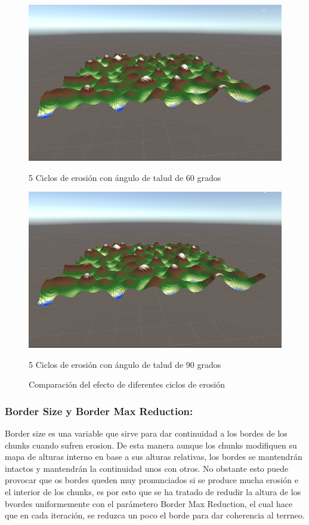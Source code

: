 \begin{figure}[ht]
    \vspace{0.5cm} %
    
    \begin{minipage}{0.45\textwidth}
        \centering
        \includegraphics[width=\textwidth]{img/talud60.png}
        \caption{5 Ciclos de erosión con ángulo de talud de 60 grados}
    \end{minipage}%
    \hfill
    \begin{minipage}{0.45\textwidth}
        \centering
        \includegraphics[width=\textwidth]{img/talud90.png}
        \caption{5 Ciclos de erosión con ángulo de talud de 90 grados}
    \end{minipage}
    \caption{Comparación del efecto de diferentes ciclos de erosión}
\end{figure}

\subsubsection{Border Size y Border Max Reduction: }Border size es una variable que sirve para dar continuidad a los bordes de los chunks cuando sufren erosion. De esta manera aunque los chunks modifiquen su mapa de alturas interno en base a sus alturas relativas, los bordes se mantendrán intactos y mantendrán la continuidad unos con otros. No obstante esto puede provocar que os bordes queden muy pronunciados si se produce mucha erosión e el interior de los chunks, es por esto que se ha tratado de redudir la altura de los bvordes uniformemente con el parámetero Border Max Reduction, el cual hace que en cada iteración, se reduzca un poco el borde para dar coherencia al terrneo.

